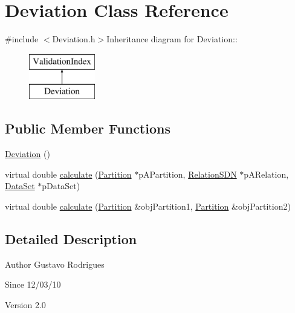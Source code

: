 \hypertarget{classDeviation}{
\section{Deviation Class Reference}
\label{classDeviation}
}


{\ttfamily \#include $<$Deviation.h$>$}Inheritance diagram for Deviation::\begin{figure}[H]
\begin{center}
\leavevmode
\includegraphics[height=2cm]{classDeviation}
\end{center}
\end{figure}
\subsection*{Public Member Functions}
\begin{DoxyCompactItemize}
\item 
\hyperlink{classDeviation_ac6a194e1389f1b31ab8b80b80cb6e74e}{Deviation} ()
\item 
virtual double \hyperlink{classDeviation_aefedb81474f0d06827a2ceaecd93f43c}{calculate} (\hyperlink{classPartition}{Partition} $\ast$pAPartition, \hyperlink{classRelationSDN}{RelationSDN} $\ast$pARelation, \hyperlink{classDataSet}{DataSet} $\ast$pDataSet)
\item 
virtual double \hyperlink{classDeviation_af722cf601ea21cc689a77c1de470bcb5}{calculate} (\hyperlink{classPartition}{Partition} \&objPartition1, \hyperlink{classPartition}{Partition} \&objPartition2)
\end{DoxyCompactItemize}


\subsection{Detailed Description}
\begin{DoxyAuthor}{Author}
Gustavo Rodrigues 
\end{DoxyAuthor}
\begin{DoxySince}{Since}
12/03/10 
\end{DoxySince}
\begin{DoxyVersion}{Version}
2.0 
\end{DoxyVersion}


